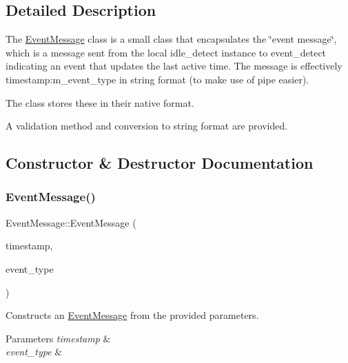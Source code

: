 \subsection{Detailed Description}
The \mbox{\hyperlink{classEventMessage}{Event\+Message}} class is a small class that encapsulates the \char`\"{}event message\char`\"{}, which is a message sent from the local idle\+\_\+detect instance to event\+\_\+detect indicating an event that updates the last active time. The message is effectively timestamp\+:m\+\_\+event\+\_\+type in string format (to make use of pipe easier). 

The class stores these in their native format.

A validation method and conversion to string format are provided. 

\subsection{Constructor \& Destructor Documentation}
\mbox{\label{classEventMessage_a2cf6e1e690c71c4151ba87102b15c86b}} 
\subsubsection{\texorpdfstring{Event\+Message()}{EventMessage()}\hspace{0.1cm}{\footnotesize\ttfamily [1/2]}}
{\footnotesize\ttfamily Event\+Message\+::\+Event\+Message (\begin{DoxyParamCaption}\item[{int64\+\_\+t}]{timestamp,  }\item[{\mbox{\hyperlink{classEventMessage_a262da559aa416f176fdda72e8b5113ab}{Event\+Type}}}]{event\+\_\+type }\end{DoxyParamCaption})}



Constructs an \mbox{\hyperlink{classEventMessage}{Event\+Message}} from the provided parameters. 


\begin{DoxyParams}{Parameters}
{\em timestamp} & \\
\hline
{\em event\+\_\+type} & \\
\hline
\end{DoxyParams}
\mbox{\label{classEventMessage_ae9314c9140aec416b1e403c2ec3dad25}} 
